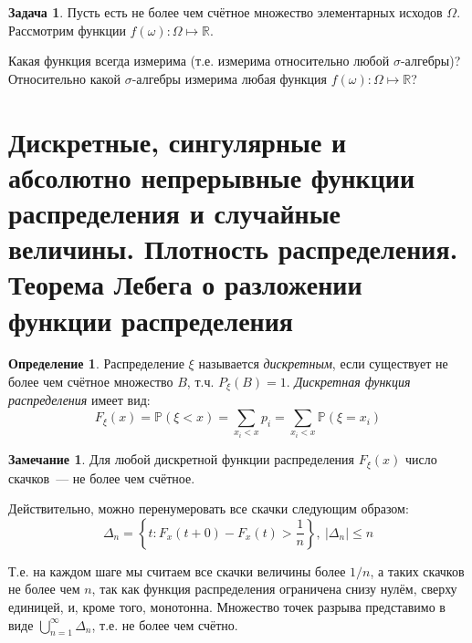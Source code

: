 \documentclass[oneside,final,14pt]{extreport}
\theoremstyle{plain}
\theoremstyle{definition}
\newtheorem*{defn}{Определение}
\newtheorem*{rmrk}{Замечание}
\newtheorem*{task}{Задача}
\theoremstyle{named}
\begin{document}
\begin{task}
Пусть есть не более чем счётное множество элементарных исходов $\Omega$. Рассмотрим функции ${f(\omega) \colon \Omega \mapsto \mathbb{R}}$.

Какая функция всегда измерима (т.е. измерима относительно любой ${\sigma \text{-алгебры}}$)? 
Относительно какой ${\sigma \text{-алгебры}}$ измерима любая функция ${f(\omega) \colon \Omega \mapsto \mathbb{R}}$?
\end{task}
 
\section{Дискретные, сингулярные и абсолютно непрерывные функции распределения и случайные величины. Плотность распределения. Теорема Лебега о разложении функции распределения}

\begin{defn}
    Распределение $\xi$ называется {\it дискретным}, если существует не более чем счётное множество $B$, т.ч. $P_\xi(B) = 1$. \textit{Дискретная функция распределения} имеет вид:
    \begin{equation*}
        F_\xi(x) = \mathbb{P}(\xi < x) = \sum\limits_{x_i < x}{}p_{i} = \sum\limits_{x_i < x}{}\mathbb{P}(\xi = x_{i})
    \end{equation*}
\end{defn}

\begin{rmrk}
    Для любой дискретной функции распределения $F_\xi(x)$ число скачков~--- не более чем счётное.
    
    Действительно, можно перенумеровать все скачки следующим образом:
    \begin{equation*}
        \Delta_{n}=\left\{t \colon F_{x}(t+0)-F_{x}(t)>\frac{1}{n}\right\},~ |\Delta_{n} | \leqslant n
    \end{equation*}
    
    Т.е. на каждом шаге мы считаем все скачки величины более $1 / n$, а таких скачков не более чем $n$, так как функция распределения ограничена снизу нулём, сверху единицей, и, кроме того, монотонна.
    Множество точек разрыва представимо в виде $\bigcup\limits_{n = 1}^{\infty} \Delta_{n}$, т.е. не более чем счётно.
\end{rmrk}
\end{document}
